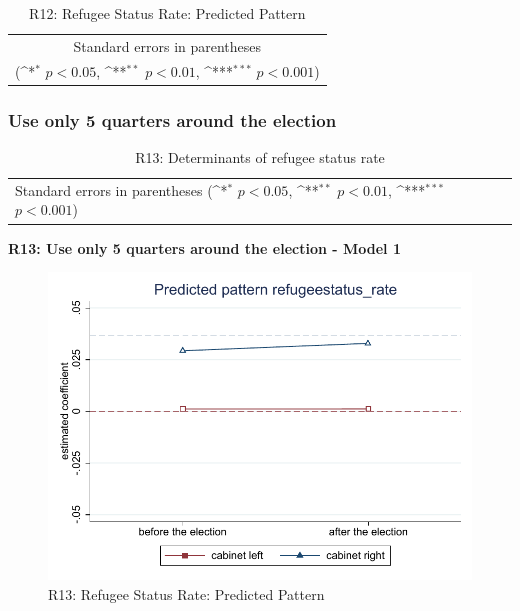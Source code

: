 \documentclass[10pt,a4paper]{scrartcl}
\begin{document}
\begin{table}[!ht]\centering
	\footnotesize
	\renewcommand{\arraystretch}{1.2}
	\def\sym#1{\ifmmode^{#1}\else\(^{#1}\)\fi}
	\caption{R12: Refugee Status Rate: Predicted Pattern}
	\begin{tabular}{l*{2}{c}}
		\hline\hline
		
		\hline\hline
		\multicolumn{3}{c}{\footnotesize Standard errors in parentheses} \\
		\multicolumn{3}{c}{\footnotesize (\sym{*} \(p<0.05\), \sym{**} \(p<0.01\), \sym{***} \(p<0.001\))} \\
	\end{tabular}
\end{table}





\clearpage
\FloatBarrier
\subsubsection{Use only 5 quarters around the election}
\begin{table}[!ht]\centering
	\renewcommand{\arraystretch}{1.25}
	\small
	\def\sym#1{\ifmmode^{#1}\else\(^{#1}\)\fi}
	\caption{R13: Determinants of refugee status rate}
	\begin{tabular}{l*{3}{c}}
		\hline\hline
		
		\hline\hline
		\multicolumn{4}{l}{\footnotesize Standard errors in parentheses (\sym{*} \(p<0.05\), \sym{**} \(p<0.01\), \sym{***} \(p<0.001\))}\\
	\end{tabular}
\end{table}

\clearpage
\textbf{R13: Use only 5 quarters around the election - Model 1}
\begin{figure}[!ht]
	\centering
	\includegraphics[width=1\textwidth]{figures_edited/refugeestatus_rate_graph1_R13.pdf}
	\caption{R13: Refugee Status Rate: Predicted Pattern}
\end{figure}
\end{document}
